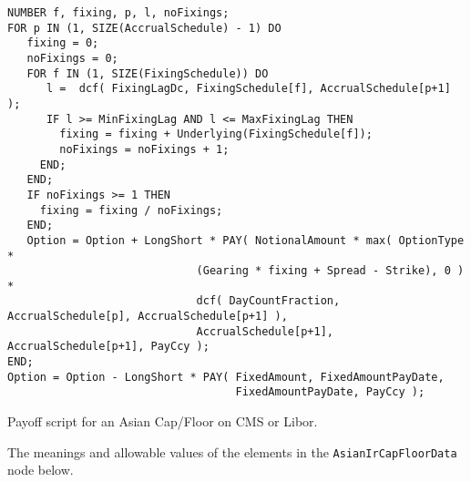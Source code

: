 \begin{listing}[hbt]
\begin{verbatim}
NUMBER f, fixing, p, l, noFixings;
FOR p IN (1, SIZE(AccrualSchedule) - 1) DO
   fixing = 0;
   noFixings = 0;
   FOR f IN (1, SIZE(FixingSchedule)) DO
      l =  dcf( FixingLagDc, FixingSchedule[f], AccrualSchedule[p+1] );
      IF l >= MinFixingLag AND l <= MaxFixingLag THEN
        fixing = fixing + Underlying(FixingSchedule[f]);
        noFixings = noFixings + 1;
     END;
   END;
   IF noFixings >= 1 THEN
     fixing = fixing / noFixings;
   END;
   Option = Option + LongShort * PAY( NotionalAmount * max( OptionType *
                             (Gearing * fixing + Spread - Strike), 0 ) *
                             dcf( DayCountFraction, AccrualSchedule[p], AccrualSchedule[p+1] ),
                             AccrualSchedule[p+1], AccrualSchedule[p+1], PayCcy );
END;
Option = Option - LongShort * PAY( FixedAmount, FixedAmountPayDate,
                                   FixedAmountPayDate, PayCcy );
\end{verbatim}
\caption{Payoff script for an Asian Cap/Floor on CMS or Libor.}
\label{lst:ir_asian_capfloor_script}
\end{listing}

The meanings and allowable values of the elements in the \lstinline!AsianIrCapFloorData! node below.


